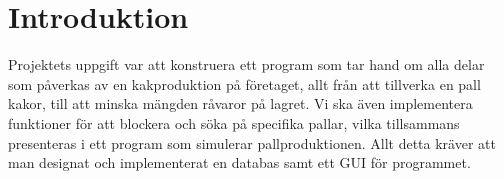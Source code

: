 \section{Introduktion}

Projektets uppgift var att konstruera ett program som tar hand om alla delar som påverkas av en kakproduktion på företaget, allt från att tillverka en pall kakor, till att minska mängden råvaror på lagret. Vi ska även implementera funktioner för att blockera och söka på specifika pallar, vilka tillsammans presenteras i ett program som simulerar pallproduktionen. Allt detta kräver att man designat och implementerat en databas samt ett GUI för programmet.
